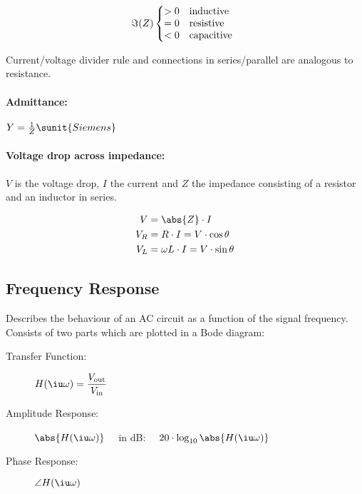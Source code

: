 	\[
		\Im(Z) \left\{\begin{array}{@{}l@{\quad}l}
			>0 & \text{inductive} \\
			= 0 & \text{resistive} \\
			<0 & \text{capacitive}
		\end{array}\right.
	\]
	
	Current/voltage divider rule and connections in series/parallel are analogous to resistance.
	
	\paragraph{Admittance:} %
		$
			Y = \frac{1}{Z} \sunit{Siemens}
		$
	
	\paragraph{Voltage drop across impedance:} %
		$V$ is the voltage drop, $I$ the current and $Z$ the impedance consisting of a resistor and an inductor in series.
		
		\begin{wrapfigure}[0]{r}{.35\columnwidth}
			\vspace{-.5cm}
		\end{wrapfigure}
		
		\begin{align*}
			V &= \abs{Z} \cdot I \\
			V_R &= R \cdot I = V \cdot \cos \theta \\
			V_L &= \omega L \cdot I = V \cdot \sin \theta
		\end{align*}

\subsection{Frequency Response} %
	Describes the behaviour of an AC circuit as a function of the signal frequency. Consists of two parts which are plotted in a Bode diagram:
	
	\begin{description}
		\item[Transfer Function:] $\displaystyle
			H(\iu \omega) = \frac{V_{\text{out}}}{V_{\text{in}}}
		$
		\item[Amplitude Response:] $\abs{H(\iu \omega)} \quad$
		in dB: $\quad 20\cdot \log_{10} \abs{H(\iu \omega)}$
		\item[Phase Response:] $\angle H(\iu \omega)$
	\end{description}
